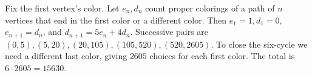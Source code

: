 Fix the first vertex's color. Let $e_n,d_n$ count proper colorings of a path of $n$ vertices that end in the first color or a different color. Then $e_1=1,d_1=0$, $e_{n+1}=d_n$, and $d_{n+1}=5e_n+4d_n$. Successive pairs are $(0,5),(5,20),(20,105),(105,520),(520,2605)$. To close the six-cycle we need a different last color, giving $2605$ choices for each first color. The total is $6\cdot2605=\boxed{15630}$.
